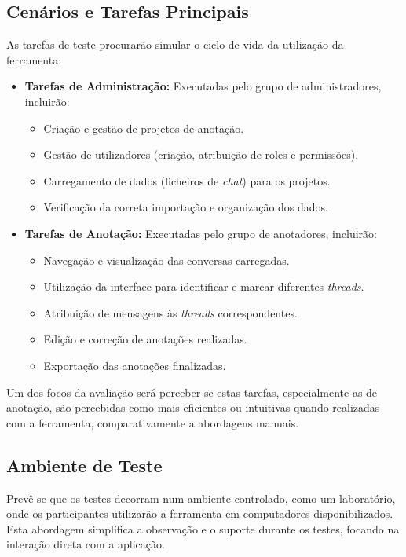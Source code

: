 \subsection{Cenários e Tarefas Principais}
As tarefas de teste procurarão simular o ciclo de vida da utilização da ferramenta:
\begin{itemize}
    \item \textbf{Tarefas de Administração:} Executadas pelo grupo de administradores, incluirão:
    \begin{itemize}
        \item Criação e gestão de projetos de anotação.
        \item Gestão de utilizadores (criação, atribuição de roles e permissões).
        \item Carregamento de dados (ficheiros de \textit{chat}) para os projetos.
        \item Verificação da correta importação e organização dos dados.
    \end{itemize}
    \item \textbf{Tarefas de Anotação:} Executadas pelo grupo de anotadores, incluirão:
    \begin{itemize}
        \item Navegação e visualização das conversas carregadas.
        \item Utilização da interface para identificar e marcar diferentes \textit{threads}.
        \item Atribuição de mensagens às \textit{threads} correspondentes.
        \item Edição e correção de anotações realizadas.
        \item Exportação das anotações finalizadas.
    \end{itemize}
\end{itemize}
Um dos focos da avaliação será perceber se estas tarefas, especialmente as de anotação, são percebidas como mais eficientes ou intuitivas quando realizadas com a ferramenta, comparativamente a abordagens manuais.

\subsection{Ambiente de Teste}
Prevê-se que os testes decorram num ambiente controlado, como um laboratório, onde os participantes utilizarão a ferramenta em computadores disponibilizados. Esta abordagem simplifica a observação e o suporte durante os testes, focando na interação direta com a aplicação.

